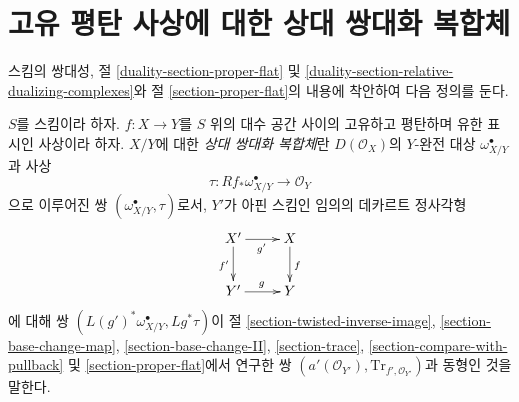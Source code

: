\section{고유 평탄 사상에 대한 상대 쌍대화 복합체}
\label{section-relative-dualizing-proper-flat}

\noindent
스킴의 쌍대성, 절
\ref{duality-section-proper-flat} 및
\ref{duality-section-relative-dualizing-complexes}와
절 \ref{section-proper-flat}의 내용에 착안하여 다음 정의를 둔다.

\begin{definition}
\label{definition-relative-dualizing-proper-flat}
$S$를 스킴이라 하자. $f : X \to Y$를 $S$ 위의 대수 공간 사이의
고유하고 평탄하며 유한 표시인 사상이라 하자. $X/Y$에 대한
{\it 상대 쌍대화 복합체}란 $D(\mathcal{O}_X)$의 $Y$-완전 대상
$\omega_{X/Y}^\bullet$과 사상
$$
\tau : Rf_*\omega_{X/Y}^\bullet \longrightarrow \mathcal{O}_Y
$$
으로 이루어진 쌍 $(\omega_{X/Y}^\bullet, \tau)$로서, $Y'$가 아핀
스킴인 임의의 데카르트 정사각형
$$
\xymatrix{
X' \ar[r]_{g'} \ar[d]_{f'} & X \ar[d]^f \\
Y' \ar[r]^g & Y
}
$$
에 대해 쌍
$(L(g')^*\omega_{X/Y}^\bullet,\allowbreak Lg^*\tau)$이 절
\ref{section-twisted-inverse-image},
\ref{section-base-change-map},
\ref{section-base-change-II},
\ref{section-trace},
\ref{section-compare-with-pullback} 및
\ref{section-proper-flat}에서 연구한 쌍
$(a'(\mathcal{O}_{Y'}),\allowbreak \text{Tr}_{f', \mathcal{O}_{Y'}})$과 동형인
것을 말한다.
\end{definition}

